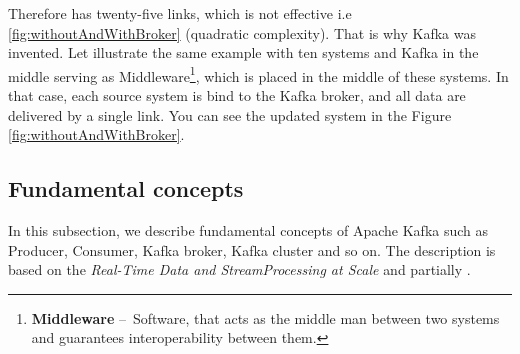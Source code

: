 Therefore has twenty-five links, which is not effective i.e \ref{fig:withoutAndWithBroker} (quadratic complexity). That is why Kafka was invented. Let illustrate the same example with ten systems and Kafka in the middle serving as Middleware\footnote{\textbf{Middleware} \---\ Software, that acts as the middle man between two systems and guarantees interoperability between them.}, which is placed in the middle of these systems. In that case, each source system is bind to the Kafka broker, and all data are delivered by a single link. You can see the updated system in the Figure \ref{fig:withoutAndWithBroker}.

\subsection{Fundamental concepts}

In this subsection, we describe fundamental concepts of Apache Kafka such as Producer, Consumer, Kafka broker, Kafka cluster and so on. The description is based on the \emph{Real-Time Data and StreamProcessing at Scale} \cite{apacheKafkaDefinitiveGuide} and partially \cite{kafkaDocumentation}. 

